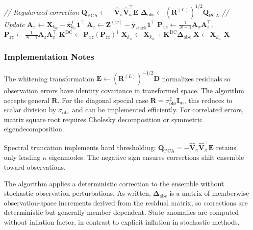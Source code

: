 \documentclass[11pt,a4paper]{article}
\begin{document}
\begin{algorithm}[H]
\begin{algorithmic}[1]
	    \State
	    \State \textit{// Regularized correction}
	    \State $\mathbf{Q}_{\mathrm{PCA}} \gets -\hat{\mathbf{V}}_{\kappa}\hat{\mathbf{V}}_{\kappa}^{\top}\mathbf{E}$
	    \State $\boldsymbol{\Delta}_{\mathrm{obs}} \gets (\mathbf{R}^{(L)})^{1/2}\mathbf{Q}_{\mathrm{PCA}}$
    \State
    \State \textit{// Update}
		    \State $\mathbf{A}_x \gets \mathbf{X}_{k_w} - \bar{\mathbf{x}}_{k_w}^f\mathbf{1}^{\top}$
		    \State $\mathbf{A}_z \gets \mathbf{Z}^{(w)} - \bar{\mathbf{y}}_{\mathrm{stack}}\mathbf{1}^{\top}$
		    \State $\mathbf{P}_{xz} \gets \frac{1}{N-1}\mathbf{A}_x\mathbf{A}_z^{\top}$, \quad $\mathbf{P}_{zz} \gets \frac{1}{N-1}\mathbf{A}_z\mathbf{A}_z^{\top}$
		    \State $\mathbf{K}^{\mathrm{DC}} \gets \mathbf{P}_{xz}(\mathbf{P}_{zz})^{\dagger}$
		    \State $\mathbf{X}_{k_w} \gets \mathbf{X}_{k_w} + \mathbf{K}^{\mathrm{DC}}\boldsymbol{\Delta}_{\mathrm{obs}}$
    \State $\mathbf{X} \gets \mathbf{X}_{k_w}$
\EndFor
\State \Return $\mathbf{X}$
\end{algorithmic}
\end{algorithm}

\subsubsection{Implementation Notes}

The whitening transformation $\mathbf{E} \gets (\mathbf{R}^{(L)})^{-1/2}\mathbf{D}$ normalizes residuals so observation errors have identity covariance in transformed space. The algorithm accepts general $\mathbf{R}$. For the diagonal special case $\mathbf{R}=\sigma_{\mathrm{obs}}^2\mathbf{I}_m$, this reduces to scalar division by $\sigma_{\mathrm{obs}}$ and can be implemented efficiently. For correlated errors, matrix square root requires Cholesky decomposition or symmetric eigendecomposition.

Spectral truncation implements hard thresholding: $\mathbf{Q}_{\mathrm{PCA}} = -\hat{\mathbf{V}}_{\kappa}\hat{\mathbf{V}}_{\kappa}^{\top}\mathbf{E}$ retains only leading $\kappa$ eigenmodes. The negative sign ensures corrections shift ensemble toward observations.

The algorithm applies a deterministic correction to the ensemble without stochastic observation perturbations. As written, $\boldsymbol{\Delta}_{\mathrm{obs}}$ is a matrix of memberwise observation-space increments derived from the residual matrix, so corrections are deterministic but generally member dependent. State anomalies are computed without inflation factor, in contrast to explicit inflation in stochastic methods.
\end{document}
